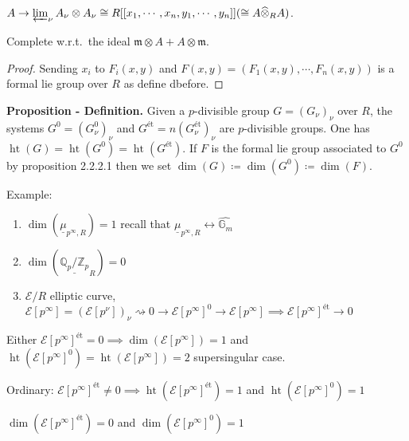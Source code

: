 \documentclass{article}
\theoremstyle{definition}
\numberwithin{theorem}{subsection}
\begin{document}
    \(A \to \varprojlim_\nu A_\nu \otimes A_\nu \cong R[[x_1, \cdots , x_n, y_1, \cdots , y_n]] (\cong A \widehat{\otimes}_R A)\).

    Complete w.r.t.\ the ideal \(\mathfrak{m} \otimes A + A \otimes \mathfrak{m}\).

    \begin{proof}

        Sending \(x_i\) to \(F_i(x,y)\) and \(F(x,y)=(F_1(x,y),\cdots ,F_n(x,y))\) is a formal lie group over \(R\) as define dbefore.

    \end{proof}

    \textbf{Proposition - Definition.} Given a \(p\)-divisible group \(G = (G_\nu)_\nu\) over \(R\), the systems \(G^0 = (G^0_\nu)_\nu\) and \(G^{\text{\'et}} =n (G_\nu^{\text{\'et}})_\nu\) are \(p\)-divisible groups. One has \(\operatorname{ht}(G) = \operatorname{ht}(G^0) = \operatorname{ht}(G^{\text{\'et}})\). If \(F\) is the formal lie group associated to \(G^0\) by proposition 2.2.2.1 then we set \(\dim(G) \coloneqq \dim (G^0) \coloneqq \dim (F)\).
    
    Example:

    \begin{enumerate}[label=\arabic*)]
        \item \(\dim(\underline{\mu}_{p^{\infty},R}) = 1\) recall that \(\underline{\mu}_{p^{\infty},R} \leftrightarrow \widehat{\mathbb{G}_m}\)
        \item \(\dim(\underline{\mathbb{Q}_p / \mathbb{Z}_p}_R ) = 0\)
        \item \(\mathscr{E} / R\) elliptic curve, \(\mathscr{E}[p^{\infty}] = (\mathscr{E} [p^\nu])_\nu \rightsquigarrow 0 \to \mathscr{E} [p^{\infty}]^0 \to \mathscr{E}[p^\infty] \implies \mathscr{E}[p^{\infty}]^{\text{\'et}} \to 0\)    
    \end{enumerate} 

    Either \(\mathscr{E} [p^{\infty}]^{\text{\'et}} = 0 \implies \dim(\mathscr{E}[p^{\infty}]) = 1\) and \(\operatorname{ht}(\mathscr{E}[p^{\infty}]^0) = \operatorname{ht}(\mathscr{E}[p^{\infty}]) = 2\) supersingular case.
    
    Ordinary: \(\mathscr{E}[p^{\infty}]^{\text{\'et}} \neq 0 \implies \operatorname{ht}(\mathscr{E}[p^{\infty}]^{\text{\'et}}) = 1\) and \(\operatorname{ht}(\mathscr{E}[p^{\infty}]^0) = 1\)
    
    \(\dim (\mathscr{E}[p^{\infty}]^{\text{\'et}}) = 0\) and \(\dim(\mathscr{E}[p^{\infty}]^0) = 1\)
 
\end{document}
